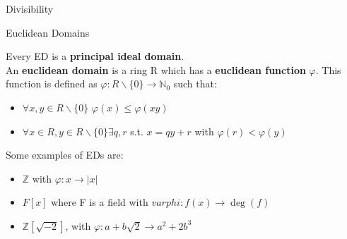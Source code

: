 \documentclass[12pt, letterpaper]{article}
\newcommand{\Z}{\mathbb{Z}}
\newcommand{\N}{\mathbb{N}}
\begin{document}
\begin{section}{Divisibility}

  \begin{subsection}{Euclidean Domains}

    Every ED is a \textbf{principal ideal domain}. \\
    An \textbf{euclidean domain} is a ring R which has a
    \textbf{euclidean function} \(\varphi\). This function is defined
    as \(\varphi: R \backslash{} \{0\} \to \N_{0}\) such that:
    \begin{itemize}
      \item \(\forall x, y \in R \backslash{} \{0\}\) \(\varphi(x) \leq \varphi(xy)\)
      \item \(\forall x \in R, y \in R \backslash{} \{0\} \exists q, r\) s.t.
            \(x = qy + r\) with \(\varphi(r) < \varphi(y)\)
    \end{itemize}

    Some examples of EDs are:
    \begin{itemize}
      \item \(\Z\) with \(\varphi: x \to |x|\)
      \item \(F[x]\) where F is a field with \(varphi: f(x) \to \deg(f)\)
      \item \(\Z[\sqrt{-2}]\), with \(\varphi: a + b\sqrt{2}
            \to a^{2} + 2b^{3}\)
    \end{itemize}

  \end{subsection}

\end{section}
\end{document}
